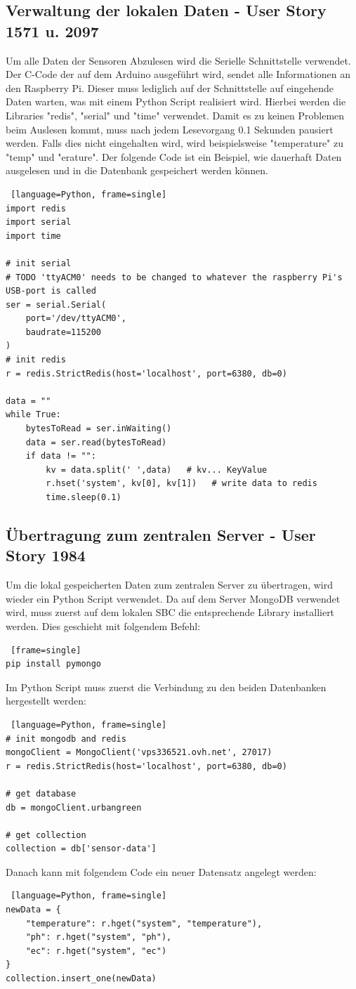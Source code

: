\documentclass[11pt]{article}
\begin{document}
\subsection{Verwaltung der lokalen Daten - User Story 1571 u. 2097}
Um alle Daten der Sensoren Abzulesen wird die Serielle Schnittstelle verwendet. Der C-Code der auf dem Arduino ausgef\"uhrt wird, sendet alle Informationen an den Raspberry Pi. Dieser muss lediglich auf der Schnittstelle auf eingehende Daten warten, was mit einem Python Script realisiert wird. Hierbei werden die Libraries "redis", "serial" und "time" verwendet. Damit es zu keinen Problemen beim Auslesen kommt, muss nach jedem Lesevorgang 0.1 Sekunden pausiert werden. Falls dies nicht eingehalten wird, wird beispielsweise "temperature" zu "temp" und "erature". Der folgende Code ist ein Beispiel, wie dauerhaft Daten ausgelesen und in die Datenbank gespeichert werden k\"onnen.
\begin{lstlisting} [language=Python, frame=single]
import redis
import serial
import time

# init serial
# TODO 'ttyACM0' needs to be changed to whatever the raspberry Pi's USB-port is called
ser = serial.Serial(
	port='/dev/ttyACM0',
	baudrate=115200
)
# init redis
r = redis.StrictRedis(host='localhost', port=6380, db=0)

data = ""
while True:
	bytesToRead = ser.inWaiting()
	data = ser.read(bytesToRead)
	if data != "":
		kv = data.split(' ',data)   # kv... KeyValue
		r.hset('system', kv[0], kv[1])   # write data to redis
		time.sleep(0.1)
\end{lstlisting}

\subsection{\"Ubertragung zum zentralen Server - User Story 1984}
Um die lokal gespeicherten Daten zum zentralen Server zu \"ubertragen, wird wieder ein Python Script verwendet. Da auf dem Server MongoDB verwendet wird, muss zuerst auf dem lokalen SBC die entsprechende Library installiert werden. Dies geschieht mit folgendem Befehl:
\begin{lstlisting} [frame=single]
pip install pymongo	
\end{lstlisting}
Im Python Script muss zuerst die Verbindung zu den beiden Datenbanken hergestellt werden:
\begin{lstlisting} [language=Python, frame=single]
# init mongodb and redis
mongoClient = MongoClient('vps336521.ovh.net', 27017)
r = redis.StrictRedis(host='localhost', port=6380, db=0)

# get database
db = mongoClient.urbangreen

# get collection
collection = db['sensor-data']
\end{lstlisting}
Danach kann mit folgendem Code ein neuer Datensatz angelegt werden:
\begin{lstlisting} [language=Python, frame=single]
newData = {
	"temperature": r.hget("system", "temperature"),
	"ph": r.hget("system", "ph"),
	"ec": r.hget("system", "ec")
}
collection.insert_one(newData)
\end{lstlisting}
\end{document}
